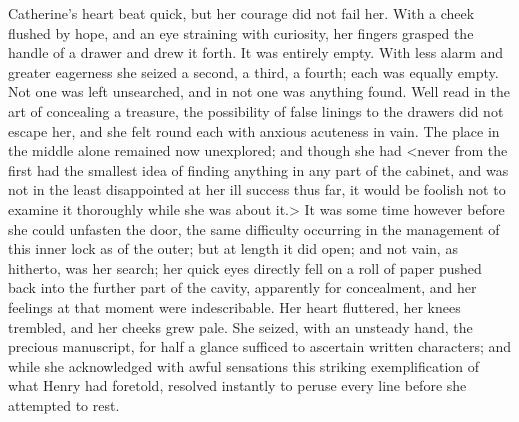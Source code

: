  Catherine's heart beat quick, but her courage did not fail her. With a cheek flushed by hope, and an eye straining with curiosity, her fingers grasped the handle of a drawer and drew it forth. It was entirely empty. With less alarm and greater eagerness she seized a second, a third, a fourth; each was equally empty. Not one was left unsearched, and in not one was anything found. Well read in the art of concealing a treasure, the possibility of false linings to the drawers did not escape her, and she felt round each with anxious acuteness in vain. The place in the middle alone remained now unexplored; and though she had <never from the first had the smallest idea of finding anything in any part of the cabinet, and was not in the least disappointed at her ill success thus far, it would be foolish not to examine it thoroughly while she was about it.> It was some time however before she could unfasten the door, the same difficulty occurring in the management of this inner lock as of the outer; but at length it did open; and not vain, as hitherto, was her search; her quick eyes directly fell on a roll of paper pushed back into the further part of the cavity, apparently for concealment, and her feelings at that moment were indescribable. Her heart fluttered, her knees trembled, and her cheeks grew pale. She seized, with an unsteady hand, the precious manuscript, for half a glance sufficed to ascertain written characters; and while she acknowledged with awful sensations this striking exemplification of what Henry had foretold, resolved instantly to peruse every line before she attempted to rest. 

